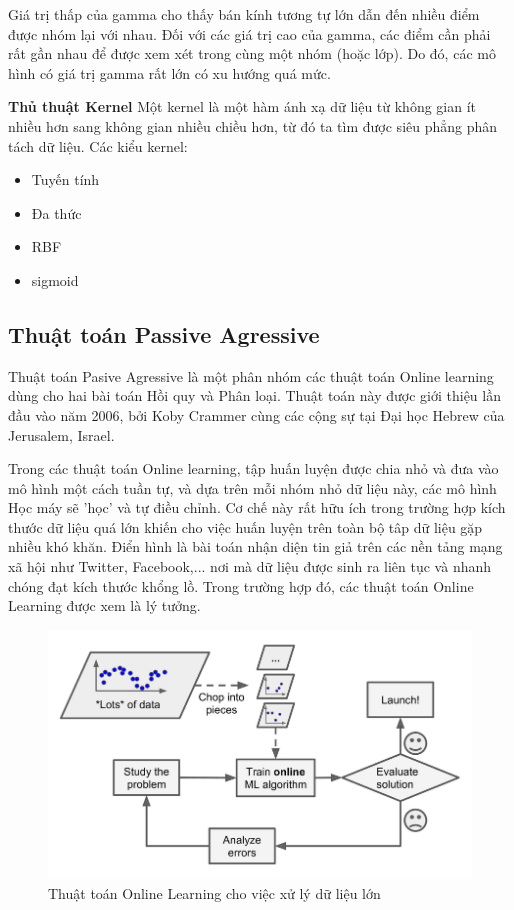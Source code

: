 \documentclass[12pt,a4paper,oneside]{book}
\begin{document}
		Giá trị thấp của gamma cho thấy bán kính tương tự lớn dẫn đến nhiều điểm được nhóm lại với nhau. Đối với các giá trị cao của gamma, các điểm cần phải rất gần nhau để được xem xét trong cùng một nhóm (hoặc lớp). Do đó, các mô hình có giá trị gamma rất lớn có xu hướng quá mức.
		
		\textbf{Thủ thuật Kernel}
		Một kernel là một hàm ánh xạ dữ liệu từ không gian ít nhiều hơn sang không gian nhiều chiều hơn, từ đó ta tìm được siêu phẳng phân tách dữ liệu. Các kiểu kernel:
		\begin{itemize}
			\item Tuyến tính
			\item Đa thức
			\item RBF
			\item sigmoid
		\end{itemize}
		
		
		
		\subsection{Thuật toán Passive Agressive}
		
		Thuật toán Pasive Agressive là một phân nhóm các thuật toán Online learning dùng cho hai bài toán Hồi quy và Phân loại. Thuật toán này được giới thiệu lần đầu vào năm 2006, bởi Koby Crammer cùng các cộng sự tại Đại học Hebrew của Jerusalem, Israel.
		
		Trong các thuật toán Online learning, tập huấn luyện được chia nhỏ và đưa vào mô hình một cách tuần tự, và dựa trên mỗi nhóm nhỏ dữ liệu này, các mô hình Học máy sẽ 'học' và tự điều chỉnh. Cơ chế này rất hữu ích trong trường hợp kích thước dữ liệu quá lớn khiến cho việc huấn luyện trên toàn bộ tâp dữ liệu gặp nhiều khó khăn. Điển hình là bài toán nhận diện tin giả trên các nền tảng mạng xã hội như Twitter, Facebook,... nơi mà dữ liệu được sinh ra liên tục và nhanh chóng đạt kích thước khổng lồ. Trong trường hợp đó, các thuật toán Online Learning được xem là lý tưởng.
		
		
		\begin{figure}[H]
			\begin{center}
				\includegraphics[width=0.8\columnwidth]{onl_learn}
			\end{center}
			\caption{Thuật toán Online Learning cho việc xử lý dữ liệu lớn}
		\end{figure}
		
\end{document}
